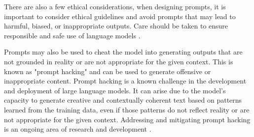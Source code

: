 There are also a few ethical considerations, when designing prompts, it is important to consider ethical guidelines and avoid prompts that may lead to harmful, biased, or inappropriate outputs. Care should be taken to ensure responsible and safe use of language models \cite{li2023ethics,kasneci2023chatgpt}.

Prompts may also be used to cheat the model into generating outputs that are not grounded in reality or are not appropriate for the given context. This is known as "prompt hacking" and can be used to generate offensive or inappropriate content. Prompt hacking is a known challenge in the development and deployment of large language models. It can arise due to the model's capacity to generate creative and contextually coherent text based on patterns learned from the training data, even if those patterns do not reflect reality or are not appropriate for the given context. Addressing and mitigating prompt hacking is an ongoing area of research and development \cite{greshake2023more,secretsydney,ignore-all-previous-instructions}.